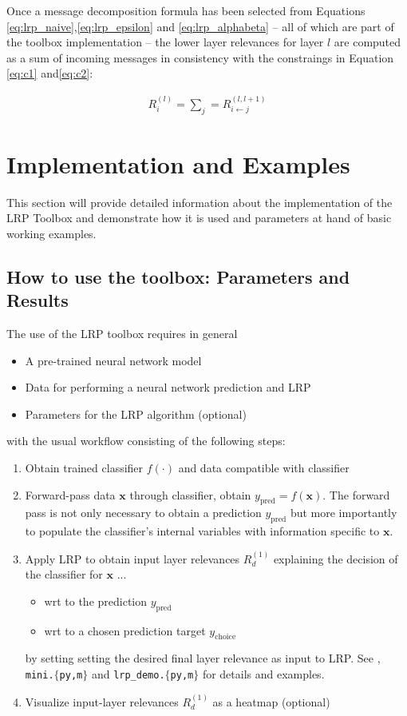 \documentclass[a4wide]{article}
\newcommand{\x}{\boldsymbol{x}}
\begin{document}
Once a message decomposition formula has been selected from Equations \ref{eq:lrp_naive},\ref{eq:lrp_epsilon} and \ref{eq:lrp_alphabeta} -- all of which are part of the toolbox implementation -- the lower layer relevances for layer $l$ are computed as a sum of incoming messages in consistency with the constraings in Equation \ref{eq:c1} and\ref{eq:c2}:

\begin{align}
R_i^{(l)} = \sum\limits_j = R^{(l,l+1)}_{i \leftarrow j}
\end{align}





\section{Implementation and Examples}
\label{sec:implementation}
This section will provide detailed information about the implementation of the LRP Toolbox and demonstrate how it is used and parameters at hand of basic working examples.

\subsection*{How to use the toolbox: Parameters and Results}

The use of the LRP toolbox requires in general
\begin{itemize}
\item A pre-trained neural network model
\item Data for performing a neural network prediction and LRP
\item Parameters for the LRP algorithm (optional)
\end{itemize}
with the usual workflow consisting of the following steps:
\begin{enumerate}
\item Obtain trained classifier $f(\cdot)$ and data compatible with classifier
\item Forward-pass data $\x$ through classifier, obtain $y_{\text{pred}} = f(\x)$. The forward pass is not only necessary to obtain a prediction $y_{\text{pred}}$ but more importantly to populate the classifier's internal variables with information specific to $\x$.
\item Apply LRP to obtain input layer relevances $R^{(1)}_d$ explaining the decision of the classifier for $\x$ ...
	\begin{itemize}
		\item wrt to the prediction $y_{\text{pred}}$ 
		\item wrt to a chosen prediction target $y_{\text{choice}}$
	\end{itemize}
	by setting setting the desired final layer relevance as input to LRP. See \cite{bach15}, \texttt{mini.$\lbrace$py,m$\rbrace$} and \texttt{lrp\_demo.$\lbrace$py,m$\rbrace$} for details and examples.
\item Visualize input-layer relevances $R_d^{(1)}$ as a heatmap (optional)
\end{enumerate}
\end{document}
